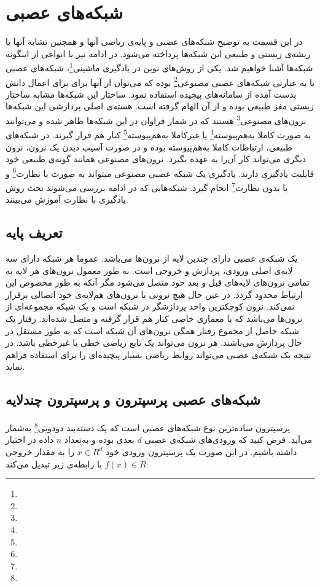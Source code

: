 \section{شبکه‌‌های عصبی}
در این قسمت به توضیح شبکه‌های عصبی و پایه‌ی ریاضی آنها و همچنین تشابه آنها با ریشه‌ی زیستی و طبیعی این شبکه‌ها پرداخته می‌شود. در ادامه نیز با انواعی از اینگونه شبکه‌ها آشنا خواهیم شد.
یکی از روش‌های نوین در یادگیری‌ ماشینی\footnote{}، شبکه‌های عصبی یا به عبارتی شبکه‌های عصبی مصنوعی\footnote{} بوده که می‌توان از آنها برای برای اعمال دانش بدست آمده از سامانه‌های پیچیده استفاده نمود. ساختار این شبکه‌ها مشابه ساختار زیستی مغز طبیعی بوده و از آن الهام گرفته است.
هسته‌ی اصلی پردازشی این شبکه‌ها نرون‌های مصنوعی‌‌\footnote{} هستند که در شمار فراوان در این شبکه‌ها ظاهر شده و می‌توانند‌ به صورت کاملا به‌هم‌پیوسته\footnote{} یا غیرکاملا به‌هم‌پیوسته\footnote{} کنار هم قرار گیرند. در شبکه‌های طبیعی، ارتباطات کاملا به‌هم‌پیوسته بوده و در صورت آسیب دیدن یک نرون، نرون دیگری می‌تواند کار آن‌را به ‌عهده بگیرد. 
نرون‌های مصنوعی همانند گونه‌ی طبیعی خود قابلیت یادگیری دارند. یادگیری یک شبکه عصبی مصنوعی میتواند به صورت با نظارت\footnote{} و یا بدون نظارت\footnote{} انجام گیرد. شبکه‌هایی که در ادامه بررسی می‌شوند تحت روش یادگیری با نظارت آموزش می‌بینند.
\subsection{تعریف پایه}
یک شبکه‌ی عصبی دارای چندین لایه از نرون‌ها می‌باشد. عموما هر شبکه دارای سه لایه‌ی اصلی ورودی، پردازش و خروجی است. به طور معمول نرون‌های هر لایه به تمامی نرون‌های لایه‌های قبل و بعد خود متصل می‌شود مگر آنکه به طور مخصوص این ارتباط محدود گردد. در عین حال هیچ نرونی با نرون‌های هم‌لایه‌ی خود اتصالی برقرار نمی‌کند. نرون کوچکترین واحد پردازشگر در شبکه است و یک شبکه مجموعه‌ای از نرون‌ها می‌باشد که با معماری خاصی کنار هم قرار گرفته و متصل شده‌اند. رفتار یک شبکه حاصل از مجموع رفتار همگی نرون‌های آن شبکه است که به طور مستقل در حال پردازش می‌باشند. هر نرون می‌تواند یک تابع ریاضی خطی یا غیرخطی باشد. در نتیجه یک شبکه‌ی عصبی می‌تواند روابط ریاضی بسیار پیچیده‌ای را برای استفاده فراهم نماید.
\subsection{شبکه‌های عصبی پرسپترون و پرسپترون چندلایه}
پرسپترون ساده‌ترین نوع شبکه‌های عصبی است که یک دسته‌بند دو‌دویی\footnote{} به‌شمار می‌آید. فرض کنید که ورودی‌های شبکه‌ی عصبی $d$ بعدی بوده و به‌تعداد $n$ داده در اختیار داشته باشیم. در این صورت یک پرسپترون ورودی‌ خود $x \in R^{d}$ را به مقدار خروجی $f(x) \in R$ با رابطه‌ی زیر تبدیل می‌کند: 

